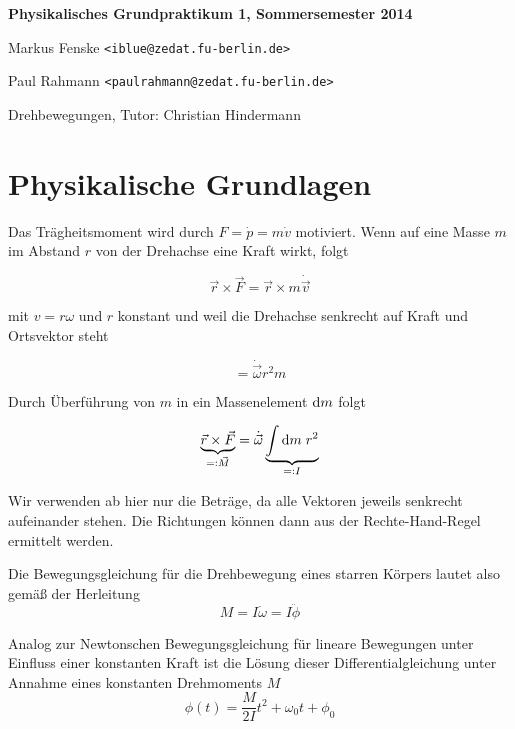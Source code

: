 \documentclass[a4paper,german,12pt,smallheadings]{scrartcl}
\begin{document}
\allowdisplaybreaks %
\begin{center}
\bfseries %
\sffamily %
\vspace{-40pt}
Physikalisches Grundpraktikum 1, Sommersemester 2014

Markus Fenske \texttt{<iblue@zedat.fu-berlin.de>}

Paul Rahmann \texttt{<paulrahmann@zedat.fu-berlin.de>}

Drehbewegungen, Tutor: Christian Hindermann
\vspace{-10pt}
\end{center}

\section*{Physikalische Grundlagen}
Das Trägheitsmoment wird durch $F = \dot{p} = m \dot{v}$ motiviert. Wenn auf eine Masse $m$
im Abstand $r$ von der Drehachse eine Kraft wirkt, folgt

\begin{equation}
  \vec{r} \times \vec{F}
  = \vec{r} \times m \dot{\vec{v}}
\end{equation}

mit $v = r \omega$ und $r$ konstant und weil die Drehachse senkrecht auf Kraft
und Ortsvektor steht

\begin{equation}
  = \dot{\vec{\omega}} r^2 m
\end{equation}

Durch Überführung von $m$ in ein Massenelement $\dif m$ folgt

\begin{equation}
  \underbrace{\vec{r} \times \vec{F}}_{=: \vec{M}} = \dot{\vec{\omega}} \underbrace{\int \dif m \; r^2}_{=: I}
\end{equation}

Wir verwenden ab hier nur die Beträge, da alle Vektoren jeweils senkrecht
aufeinander stehen. Die Richtungen können dann aus der Rechte-Hand-Regel
ermittelt werden.

Die Bewegungsgleichung für die Drehbewegung eines starren Körpers lautet also gemäß der Herleitung
\begin{equation}
  M = I \dot{\omega} = I \ddot{\phi}
\end{equation}

Analog zur Newtonschen Bewegungsgleichung für lineare Bewegungen unter Einfluss
einer konstanten Kraft ist die Lösung dieser Differentialgleichung unter
Annahme eines konstanten Drehmoments $M$
\begin{equation}
  \phi(t) = \frac{M}{2I}t^2 + \omega_0 t + \phi_0
\end{equation}
\end{document}
